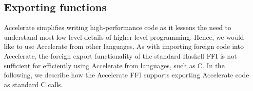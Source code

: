 
%

\subsection{Exporting functions}
\label{sec:foreign-export}

Accelerate simplifies writing high-performance code as it lessens the need to understand most low-level details of higher level programming. Hence, we would like to use Accelerate from other languages. As with importing foreign code into Accelerate, the foreign export functionality of the standard Haskell FFI is not sufficient for efficiently using Accelerate from languages, such as C. In the following, we describe how the Accelerate FFI supports exporting Accelerate code as standard C calls.

